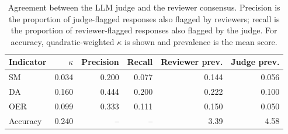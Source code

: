 \begin{table}[H]
\caption{Agreement between the LLM judge and the reviewer consensus. Precision is the proportion of judge-flagged responses also flagged by reviewers; recall is the proportion of reviewer-flagged responses also flagged by the judge. For accuracy, quadratic-weighted $\kappa$ is shown and prevalence is the mean score.}
\label{tab:judge:validation}
\centering
\begin{tabular}{lrrrrr}
\toprule
Indicator & $\kappa$ & Precision & Recall & Reviewer prev. & Judge prev. \\
\midrule
SM & 0.034 & 0.200 & 0.077 & 0.144 & 0.056 \\
DA & 0.160 & 0.444 & 0.200 & 0.222 & 0.100 \\
OER & 0.099 & 0.333 & 0.111 & 0.150 & 0.050 \\
Accuracy & 0.240 & -- & -- & 3.39 & 4.58 \\
\bottomrule
\end{tabular}
\end{table}
